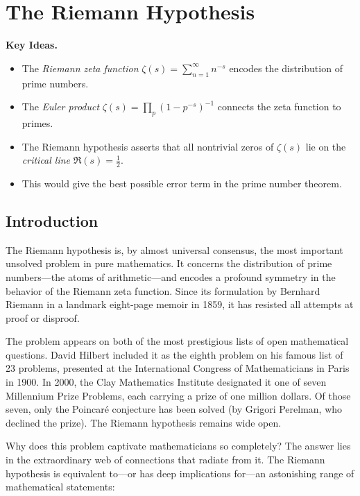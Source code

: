 \chapter{The Riemann Hypothesis}
\label{ch:riemann}

\noindent\textbf{Key Ideas.}
\begin{itemize}
  \item The \emph{Riemann zeta function} $\zeta(s) = \sum_{n=1}^{\infty} n^{-s}$ encodes the distribution of prime numbers.
  \item The \emph{Euler product} $\zeta(s) = \prod_p (1 - p^{-s})^{-1}$ connects the zeta function to primes.
  \item The Riemann hypothesis asserts that all nontrivial zeros of $\zeta(s)$ lie on the \emph{critical line} $\Re(s) = \tfrac{1}{2}$.
  \item This would give the best possible error term in the prime number theorem.
\end{itemize}

\bigskip

\section{Introduction}

The Riemann hypothesis is, by almost universal consensus, the most important unsolved problem in pure mathematics. It concerns the distribution of prime numbers---the atoms of arithmetic---and encodes a profound symmetry in the behavior of the Riemann zeta function. Since its formulation by Bernhard Riemann in a landmark eight-page memoir in 1859, it has resisted all attempts at proof or disproof.

The problem appears on both of the most prestigious lists of open mathematical questions. David Hilbert included it as the eighth problem on his famous list of 23 problems, presented at the International Congress of Mathematicians in Paris in 1900. In 2000, the Clay Mathematics Institute designated it one of seven Millennium Prize Problems, each carrying a prize of one million dollars. Of those seven, only the Poincar\'{e} conjecture has been solved (by Grigori Perelman, who declined the prize). The Riemann hypothesis remains wide open.

Why does this problem captivate mathematicians so completely? The answer lies in the extraordinary web of connections that radiate from it. The Riemann hypothesis is equivalent to---or has deep implications for---an astonishing range of mathematical statements:

